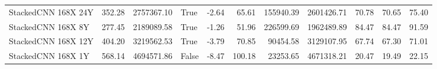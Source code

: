 \begin{tabular}{lrrlrrrrrrr}
StackedCNN 168X 24Y & 352.28 & 2757367.10 & True & -2.64 & 65.61 & 155940.39 & 2601426.71 & 70.78 & 70.65 & 75.40 \\
StackedCNN 168X 8Y & 277.45 & 2189089.58 & True & -1.26 & 51.96 & 226599.69 & 1962489.89 & 84.47 & 84.47 & 91.59 \\
StackedCNN 168X 12Y & 404.20 & 3219562.53 & True & -3.79 & 70.85 & 90454.58 & 3129107.95 & 67.74 & 67.30 & 71.01 \\
StackedCNN 168X 1Y & 568.14 & 4694571.86 & False & -8.47 & 100.18 & 23253.65 & 4671318.21 & 20.47 & 19.49 & 22.15 \\
\bottomrule
\end{tabular}
